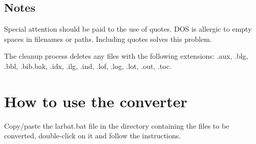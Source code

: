 \documentclass{article}
\begin{document}
\subsection{Notes}

Special attention should be paid to the use of quotes. DOS is allergic to empty spaces in filenames or paths. Including quotes solves this problem.

The cleanup process deletes any files with the following extensions: .aux, .blg, .bbl, .bib.bak, .idx, .ilg, .ind, .lof, .log, .lot, .out, .toc.


\section{How to use the converter}

Copy/paste the larbat.bat file in the directory containing the files to be converted, double-click on it and follow the instructions.


\newpage

\tableofcontents
\end{document}
